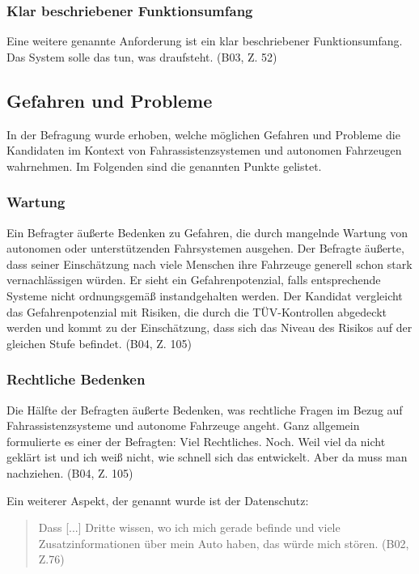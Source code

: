 \documentclass[12pt]{article}
\begin{document}
\subsubsection*{Klar beschriebener Funktionsumfang}
Eine weitere genannte Anforderung ist ein klar beschriebener Funktionsumfang. Das System solle \glqq das tun, was draufsteht\grqq{}. (B03, Z. 52)

\subsection{Gefahren und Probleme}
In der Befragung wurde erhoben, welche möglichen Gefahren und Probleme die Kandidaten im Kontext von Fahrassistenzsystemen und autonomen Fahrzeugen wahrnehmen. Im Folgenden sind die genannten Punkte gelistet.

\subsubsection*{Wartung}
Ein Befragter äußerte Bedenken zu Gefahren, die durch mangelnde Wartung von autonomen oder unterstützenden Fahrsystemen ausgehen. Der Befragte äußerte, dass seiner Einschätzung nach viele Menschen ihre Fahrzeuge generell schon stark vernachlässigen würden. Er sieht ein Gefahrenpotenzial, falls entsprechende Systeme nicht ordnungsgemäß instandgehalten werden. Der Kandidat vergleicht das Gefahrenpotenzial mit Risiken, die durch die TÜV-Kontrollen abgedeckt werden und kommt zu der Einschätzung, dass sich das Niveau des Risikos auf der gleichen Stufe befindet. (B04, Z. 105)

\subsubsection*{Rechtliche Bedenken}
Die Hälfte der Befragten äußerte Bedenken, was rechtliche Fragen im Bezug auf Fahrassistenzsysteme und autonome Fahrzeuge angeht. Ganz allgemein formulierte es einer der Befragten: \glqq Viel Rechtliches. Noch. Weil viel da nicht geklärt ist und ich weiß nicht, wie schnell sich das entwickelt. Aber da muss man nachziehen.\grqq{} (B04, Z. 105)

Ein weiterer Aspekt, der genannt wurde ist der Datenschutz:
\begin{quote}
    Dass [...] Dritte wissen, wo ich mich gerade befinde und viele Zusatzinformationen über mein Auto haben, das würde mich stören. (B02, Z.76)
\end{quote}
\end{document}
